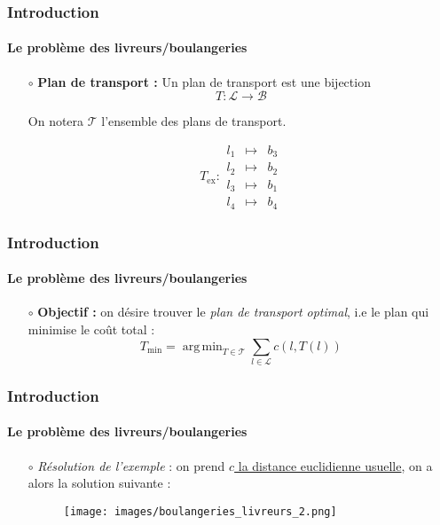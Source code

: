 \documentclass{beamer}
\DeclareMathOperator*{\argmin}{arg\,min}
\begin{document}
\begin{frame}
	\frametitle{Introduction}
	\framesubtitle{Le problème des livreurs/boulangeries} 
	\begin{itemize}
		\item[$\circ$] \textbf{Plan de transport :} Un plan de transport est une bijection \[T : \mathcal{L} \to \mathcal{B}\]  \begin{flushright}
			On notera $\mathcal{T}$ l'ensemble des plans de transport.
		\end{flushright} 
		\vspace*{\fill}
		\[T_\text{ex} :  \begin{array}{|rcl}
  l_1 & \longmapsto & b_3 \\
  l_2 & \longmapsto & b_2 \\
  l_3 &\longmapsto & b_1 \\
  l_4 &\longmapsto & b_4
\end{array}\]
\vspace*{\fill}
			
	\end{itemize}
\end{frame}
\begin{frame}
	\frametitle{Introduction}
	\framesubtitle{Le problème des livreurs/boulangeries}
	\begin{itemize}
		\item[$\circ$] \textbf{Objectif :} on désire trouver le \emph{plan de transport optimal}, i.e le plan qui minimise le coût total : \[\boxed{T_\text{min} = \argmin_{T \in \mathcal{T}} \sum_{l \in \mathcal{L}} c\left(l, T(l)\right)} \] 
	\end{itemize}
\end{frame}

\begin{frame}
	\frametitle{Introduction}
	\framesubtitle{Le problème des livreurs/boulangeries} 
	
		\begin{itemize}
			\item[$\circ$] \emph{Résolution de l'exemple} : on prend \underline{$c$ la distance euclidienne usuelle}, on a alors la solution suivante : \begin{figure}[h!]
				\centering 
				\texttt{[image: images/boulangeries\_livreurs\_2.png]}
			\end{figure}
		\end{itemize}
	

\end{frame}
\end{document}
